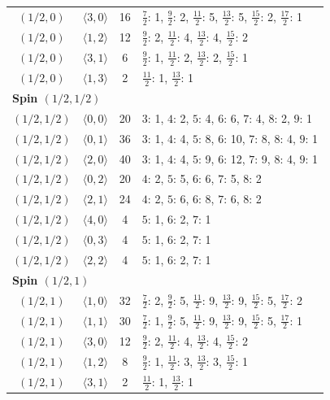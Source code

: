 \begin{longtable}{c c c p{8.8cm}}
$(1/2,0)$ & $\langle 3,0\rangle$ & 16 & $\frac{7}{2}$: 1, $\frac{9}{2}$: 2, $\frac{11}{2}$: 5, $\frac{13}{2}$: 5, $\frac{15}{2}$: 2, $\frac{17}{2}$: 1 \\
$(1/2,0)$ & $\langle 1,2\rangle$ & 12 & $\frac{9}{2}$: 2, $\frac{11}{2}$: 4, $\frac{13}{2}$: 4, $\frac{15}{2}$: 2 \\
$(1/2,0)$ & $\langle 3,1\rangle$ & 6 & $\frac{9}{2}$: 1, $\frac{11}{2}$: 2, $\frac{13}{2}$: 2, $\frac{15}{2}$: 1 \\
$(1/2,0)$ & $\langle 1,3\rangle$ & 2 & $\frac{11}{2}$: 1, $\frac{13}{2}$: 1 \\
\midrule
\multicolumn{4}{l}{\textbf{Spin $(1/2,1/2)$}}\\
$(1/2,1/2)$ & $\langle 0,0\rangle$ & 20 & $3$: 1, $4$: 2, $5$: 4, $6$: 6, $7$: 4, $8$: 2, $9$: 1 \\
$(1/2,1/2)$ & $\langle 0,1\rangle$ & 36 & $3$: 1, $4$: 4, $5$: 8, $6$: 10, $7$: 8, $8$: 4, $9$: 1 \\
$(1/2,1/2)$ & $\langle 2,0\rangle$ & 40 & $3$: 1, $4$: 4, $5$: 9, $6$: 12, $7$: 9, $8$: 4, $9$: 1 \\
$(1/2,1/2)$ & $\langle 0,2\rangle$ & 20 & $4$: 2, $5$: 5, $6$: 6, $7$: 5, $8$: 2 \\
$(1/2,1/2)$ & $\langle 2,1\rangle$ & 24 & $4$: 2, $5$: 6, $6$: 8, $7$: 6, $8$: 2 \\
$(1/2,1/2)$ & $\langle 4,0\rangle$ & 4 & $5$: 1, $6$: 2, $7$: 1 \\
$(1/2,1/2)$ & $\langle 0,3\rangle$ & 4 & $5$: 1, $6$: 2, $7$: 1 \\
$(1/2,1/2)$ & $\langle 2,2\rangle$ & 4 & $5$: 1, $6$: 2, $7$: 1 \\
\midrule
\multicolumn{4}{l}{\textbf{Spin $(1/2,1)$}}\\
$(1/2,1)$ & $\langle 1,0\rangle$ & 32 & $\frac{7}{2}$: 2, $\frac{9}{2}$: 5, $\frac{11}{2}$: 9, $\frac{13}{2}$: 9, $\frac{15}{2}$: 5, $\frac{17}{2}$: 2 \\
$(1/2,1)$ & $\langle 1,1\rangle$ & 30 & $\frac{7}{2}$: 1, $\frac{9}{2}$: 5, $\frac{11}{2}$: 9, $\frac{13}{2}$: 9, $\frac{15}{2}$: 5, $\frac{17}{2}$: 1 \\
$(1/2,1)$ & $\langle 3,0\rangle$ & 12 & $\frac{9}{2}$: 2, $\frac{11}{2}$: 4, $\frac{13}{2}$: 4, $\frac{15}{2}$: 2 \\
$(1/2,1)$ & $\langle 1,2\rangle$ & 8 & $\frac{9}{2}$: 1, $\frac{11}{2}$: 3, $\frac{13}{2}$: 3, $\frac{15}{2}$: 1 \\
$(1/2,1)$ & $\langle 3,1\rangle$ & 2 & $\frac{11}{2}$: 1, $\frac{13}{2}$: 1 \\

\end{longtable}
